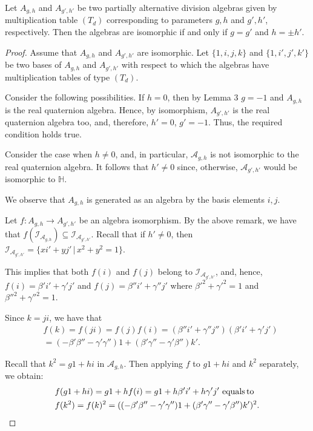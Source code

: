\documentclass[10pt,a4paper]{amsart}
\begin{document}
\begin{theorem} \label{isomcond}
Let $A_{g, h}$ and $A_{g', h'}$ be two partially alternative division algebras given by multiplication table $(T_d)$ corresponding to parameters $g, h$ and $g', h'$, respectively.  Then the algebras are isomorphic if and only if $g=g'$ and $h = \pm h'$.
\end{theorem}

\begin{proof}
Assume that  $A_{g, h}$ and $A_{g', h'}$ are isomorphic. Let $\{1, i, j, k\}$ and $\{1, i', j', k'\}$ be two bases of $A_{g, h}$ and $A_{g', h'}$ with respect to which the algebras 
have multiplication tables of type $(T_d)$. 

 Consider the following possibilities. If $h=0$, then by Lemma 3 $g=-1$ and $A_{g, h}$ is the real quaternion algebra. Hence, by isomorphism,
$A_{g', h'}$ is the real quaternion algebra too, and, therefore, $h'=0$, $g'=-1$. Thus, the required condition holds true. 

Consider the case when $h\neq 0$, and, in particular, $\mathcal A_{g, h}$ is not isomorphic to the real quaternion algebra. It follows that $h'\neq 0$ since, otherwise, ${\mathcal A}_{g', h'}$ would be isomorphic to $\mathbb H$.

We observe that $A_{g,h}$ is generated as an algebra by the basis elements $i, j$.

Let $f: A_{g, h}\to A_{g', h'}$ be an algebra isomorphism.  By the above remark, we have that $f({\mathcal I}_{{\mathcal A}_{g, h}}) \subseteq {\mathcal I}_{{\mathcal A}_{g', h'}}$. 
Recall that if $h'\neq 0$, then $ \mathcal I_{{\mathcal A}_{g', h'}} = \{  x i' + y j' \,|\, x^2 + y^2 = 1\}.$ 

This implies that  both $f(i)$ and $f(j)$ belong to $ \mathcal I_{{\mathcal A}_{g', h'}}$, and, hence, 
$f(i) = \beta' i' + \gamma' j'$ and $f(j) = \beta'' i' + \gamma'' j'$ where $\beta'^2 +\gamma'^2 = 1$ and $\beta''^2 +\gamma''^2 = 1$.  

Since $k=ji$, we have that 
\begin{align*}
&f(k) = f(ji) = f(j) f(i) = (\beta'' i' + \gamma'' j'') (\beta' i' + \gamma' j')\\
&= (-\beta'\beta'' - \gamma'\gamma'' )1 + (\beta'\gamma'' - \gamma'\beta'') k'.
\end{align*}

Recall that $k^2 = g1+hi$ in $\mathcal A_{g, h}$. Then applying $f$ to $g1 + hi$ and $k^2$ separately, we obtain: 
\begin{align*}
& f(g1+hi)= g 1 + h f(i) = g1 + h \beta' i' + h \gamma' j' \,\, \text{equals\,to}  \\
& f(k^2)= f(k)^2 =  ( (-\beta' \beta'' - \gamma'\gamma'') 1 + (\beta' \gamma'' - \gamma' \beta'') k' )^2.
\end{align*}


\end{proof}
\end{document}
